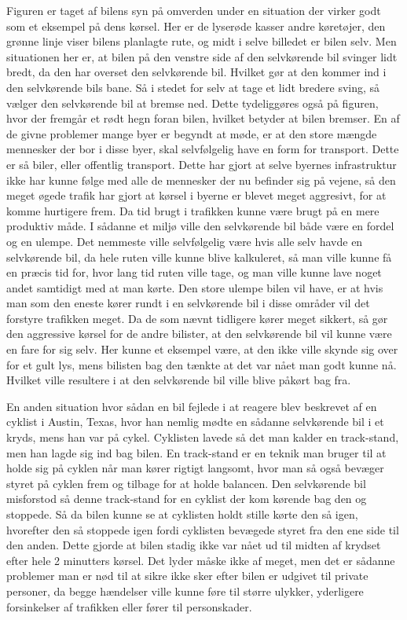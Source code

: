 Figuren er taget af bilens syn på omverden under  en situation der virker godt som  et eksempel på dens kørsel. Her er de lyserøde kasser andre køretøjer, den grønne linje viser bilens planlagte rute, og midt i selve billedet er bilen selv. Men situationen her er, at bilen på den venstre side af den selvkørende bil svinger lidt bredt, da den har overset den selvkørende bil. Hvilket gør at den kommer ind i den selvkørende bils bane. Så i stedet for selv at tage et lidt bredere sving, så vælger den selvkørende bil at bremse ned. Dette tydeliggøres også på figuren, hvor der fremgår et rødt hegn foran bilen, hvilket  betyder at bilen bremser\cite{Backchannel}. En af de givne problemer mange byer er begyndt at møde, er at den store mængde mennesker der bor i disse byer, skal selvfølgelig have en form for transport. Dette er så biler, eller offentlig transport. Dette har gjort at selve byernes infrastruktur ikke har kunne følge med alle de mennesker der nu befinder sig på vejene, så den meget øgede trafik har gjort at kørsel i byerne er blevet meget aggresivt, for at komme hurtigere frem. Da tid brugt i trafikken kunne være brugt på en mere produktiv måde\cite{Michelin}. I sådanne et miljø ville den selvkørende bil både være en fordel og en ulempe. Det nemmeste ville selvfølgelig være hvis alle selv havde en selvkørende bil, da hele ruten ville kunne blive kalkuleret, så man ville kunne få en præcis tid for, hvor lang tid ruten ville tage, og man ville kunne lave noget andet samtidigt med at man kørte. Den store ulempe bilen vil have, er at hvis man som den eneste kører rundt i en selvkørende bil i disse områder vil det forstyre trafikken meget. Da de som nævnt tidligere kører meget sikkert, så gør den aggressive kørsel for de andre bilister, at den selvkørende bil vil kunne være en fare for sig selv. Her kunne et eksempel være, at den ikke ville skynde sig over for et gult lys, mens bilisten bag den tænkte at det var nået man godt kunne nå. Hvilket ville resultere i at den selvkørende bil ville blive påkørt bag fra.

En anden situation hvor sådan en bil fejlede i at reagere blev beskrevet af en cyklist i Austin, Texas, hvor han nemlig mødte en sådanne selvkørende bil i et kryds, mens han var på cykel. Cyklisten lavede så det man kalder en track-stand, men han lagde sig ind bag bilen. En track-stand er en teknik man bruger til at holde sig på cyklen når man kører rigtigt langsomt, hvor man så også bevæger styret på cyklen frem og tilbage for at holde balancen. Den selvkørende bil misforstod så denne track-stand for en cyklist der kom kørende bag den og stoppede. Så da bilen kunne se at cyklisten holdt stille kørte den så igen, hvorefter den så stoppede igen fordi cyklisten bevægede styret fra den ene side til den anden. Dette gjorde at bilen stadig ikke var nået ud til midten af krydset efter hele 2 minutters kørsel\cite{VOX}. Det lyder måske ikke af meget, men det er sådanne problemer man er nød til at sikre ikke sker efter bilen er udgivet til private personer, da begge hændelser ville kunne føre til større ulykker, yderligere forsinkelser af trafikken eller fører til personskader. 